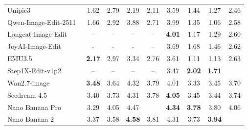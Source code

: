 \documentclass{llmxive}
\begin{document}
\begin{table}[t]
{\begin{tabular}{l|cccc|cccc}
            Unipic3~\cite{wei2026skywork}
            & 1.62 & 2.79 & 2.19 & \cellcolor[HTML]{C8C8C8}2.11 & 3.59 & 1.44 & 1.27
            & \cellcolor[HTML]{C8C8C8}2.46 \\

            Qwen-Image-Edit-2511~\cite{wu2025qwen}
            & 1.66 & 2.92 & 3.88 & \cellcolor[HTML]{C8C8C8}2.71 & 3.99 & 1.35 & 1.06
            & \cellcolor[HTML]{C8C8C8}2.58 \\
            
            Longcat-Image-Edit~\cite{team2025longcat}
            & -- & -- & -- & --
            & \textbf{4.01} & 1.17 & 1.29
            & \cellcolor[HTML]{C8C8C8}2.60 \\

            JoyAI-Image-Edit~\cite{joyaiimageedit}
            & - & - & - & --
            & 3.69 & 1.68 & 1.46
            & \cellcolor[HTML]{C8C8C8}2.62 \\

            EMU3.5~\cite{cui2025emu3}
            & \textbf{2.17} & 2.97 & 3.34 & \cellcolor[HTML]{C8C8C8}2.76 & 3.61 & 1.11 & 1.13
            & \cellcolor[HTML]{C8C8C8}2.63 \\


            Step1X-Edit-v1p2~\cite{liu2025step1x}
            & -- & -- & -- & --
            & 3.47 & \textbf{2.02} & \textbf{1.71}
            & \cellcolor[HTML]{C8C8C8}{\textbf{2.66}} \\

     

    
            \midrule

            Wan2.7-image~\cite{nanobananapro}
            &  \textbf{3.48} & 3.64 & 4.32 & \cellcolor[HTML]{C8C8C8}3.79 & 4.01 & 3.33 & 3.45
            & \cellcolor[HTML]{C8C8C8} 3.70 \\
            
            Seedream 4.5~\cite{seedream2025seedream}
            & 3.40 & 3.73 & 4.31 & \cellcolor[HTML]{C8C8C8}3.78 & \textbf{4.05} & 3.45 & 3.44
            & \cellcolor[HTML]{C8C8C8} 3.74 \\

            
            Nano Banana Pro~\cite{nanobananapro}
            & 3.29 & 4.05 & 4.47 & \cellcolor[HTML]{C8C8C8}{\textbf{3.87}} & \textbf{4.34} & \textbf{3.78} & 3.80
            & \cellcolor[HTML]{C8C8C8}4.06 \\

            Nano Banana 2~\cite{gemini3pro}
            & 3.37 & 3.58 & \textbf{4.58} & \cellcolor[HTML]{C8C8C8}3.81 & 4.31 & 3.73 & \textbf{3.94}
            & \cellcolor[HTML]{C8C8C8}{\textbf{4.07}} \\


\end{tabular}}
\end{table}
\end{document}
